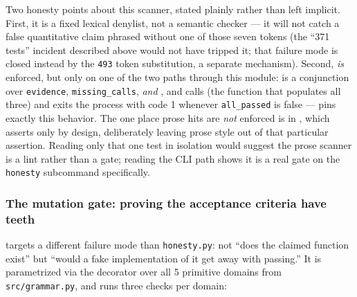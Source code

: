 \documentclass[
]{article}
\begin{document}
Two honesty points about this scanner, stated plainly rather than left
implicit. First, it is a fixed lexical denylist, not a semantic checker
--- it will not catch a false quantitative claim phrased without one of
those seven tokens (the ``371 tests'' incident described above would not
have tripped it; that failure mode is closed instead by the \texttt{493}
token substitution, a separate mechanism). Second,
 \emph{is} enforced, but only on one of the
two paths through this module:  is a
conjunction over \texttt{evidence}, \texttt{missing\_calls}, \emph{and}
, and 
calls  (the function that populates all three)
and exits the process with code 1 whenever \texttt{all\_passed} is false
---  pins
exactly this behavior. The one place prose hits are \emph{not} enforced
is  in
, which asserts only
 by design, deliberately leaving prose
style out of that particular assertion. Reading only that one test in
isolation would suggest the prose scanner is a lint rather than a gate;
reading the CLI path shows it is a real gate on the \texttt{honesty}
subcommand specifically.

\subsubsection{The mutation gate: proving the acceptance criteria have
teeth}\label{the-mutation-gate-proving-the-acceptance-criteria-have-teeth}

 targets a different failure mode than
\texttt{honesty.py}: not ``does the claimed function exist'' but ``would
a fake implementation of it get away with passing.'' It is parametrized
via the
decorator over all 5 primitive domains from \texttt{src/grammar.py}, and
runs three checks per domain:
\end{document}
